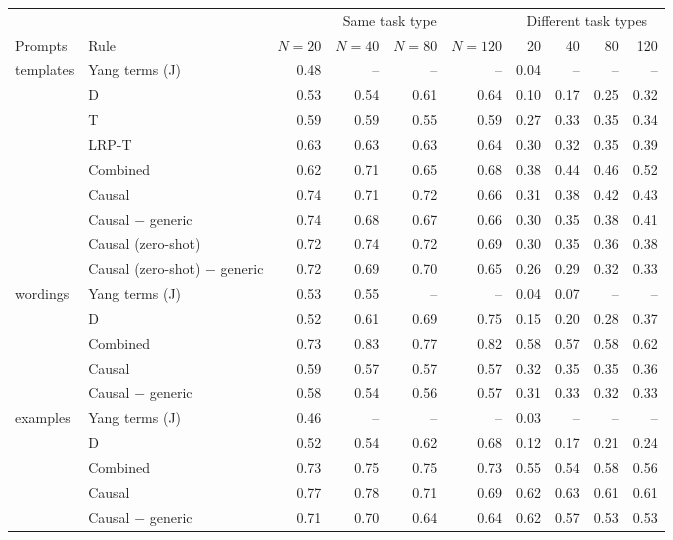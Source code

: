 \begin{tabular}{@{}llrrrrrrrr@{}}
\toprule
& & \multicolumn{4}{c}{Same task type} & \multicolumn{4}{c}{Different task types} \\
\cmidrule(lr){3-6} \cmidrule(lr){7-10}
Prompts & Rule & $N=20$ & $N=40$ & $N=80$ & $N=120$ & 20 & 40 & 80 & 120 \\
\midrule
templates & Yang terms (J) & 0.48 & -- & -- & -- & 0.04 & -- & -- & -- \\
 & D & 0.53 & 0.54 & 0.61 & 0.64 & 0.10 & 0.17 & 0.25 & 0.32 \\
 & T & 0.59 & 0.59 & 0.55 & 0.59 & 0.27 & 0.33 & 0.35 & 0.34 \\
 & LRP-T & 0.63 & 0.63 & 0.63 & 0.64 & 0.30 & 0.32 & 0.35 & 0.39 \\
 & Combined & 0.62 & 0.71 & 0.65 & 0.68 & 0.38 & 0.44 & 0.46 & 0.52 \\
 & Causal & 0.74 & 0.71 & 0.72 & 0.66 & 0.31 & 0.38 & 0.42 & 0.43 \\
 & Causal $-$ generic & 0.74 & 0.68 & 0.67 & 0.66 & 0.30 & 0.35 & 0.38 & 0.41 \\
 & Causal (zero-shot) & 0.72 & 0.74 & 0.72 & 0.69 & 0.30 & 0.35 & 0.36 & 0.38 \\
 & Causal (zero-shot) $-$ generic & 0.72 & 0.69 & 0.70 & 0.65 & 0.26 & 0.29 & 0.32 & 0.33 \\
\addlinespace
wordings & Yang terms (J) & 0.53 & 0.55 & -- & -- & 0.04 & 0.07 & -- & -- \\
 & D & 0.52 & 0.61 & 0.69 & 0.75 & 0.15 & 0.20 & 0.28 & 0.37 \\
 & Combined & 0.73 & 0.83 & 0.77 & 0.82 & 0.58 & 0.57 & 0.58 & 0.62 \\
 & Causal & 0.59 & 0.57 & 0.57 & 0.57 & 0.32 & 0.35 & 0.35 & 0.36 \\
 & Causal $-$ generic & 0.58 & 0.54 & 0.56 & 0.57 & 0.31 & 0.33 & 0.32 & 0.33 \\
\addlinespace
examples & Yang terms (J) & 0.46 & -- & -- & -- & 0.03 & -- & -- & -- \\
 & D & 0.52 & 0.54 & 0.62 & 0.68 & 0.12 & 0.17 & 0.21 & 0.24 \\
 & Combined & 0.73 & 0.75 & 0.75 & 0.73 & 0.55 & 0.54 & 0.58 & 0.56 \\
 & Causal & 0.77 & 0.78 & 0.71 & 0.69 & 0.62 & 0.63 & 0.61 & 0.61 \\
 & Causal $-$ generic & 0.71 & 0.70 & 0.64 & 0.64 & 0.62 & 0.57 & 0.53 & 0.53 \\
\bottomrule
\end{tabular}
